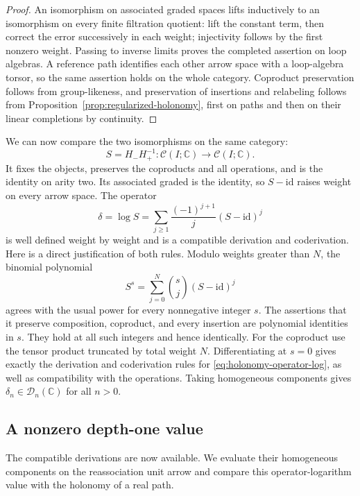 \documentclass[11pt]{article}
\theoremstyle{definition}
\theoremstyle{remark}
\numberwithin{equation}{section}
\begin{document}
\begin{proof}
An isomorphism on associated graded spaces lifts inductively to an
isomorphism on every finite filtration quotient: lift the constant
term, then correct the error successively in each weight; injectivity
follows by the first nonzero weight.  Passing to inverse limits proves
the completed assertion on loop algebras.  A reference path identifies
each other arrow space with a loop-algebra torsor, so the same assertion
holds on the whole category.  Coproduct preservation follows from
group-likeness, and preservation of insertions and relabeling follows
from Proposition~\ref{prop:regularized-holonomy}, first on paths and
then on their linear completions by continuity.
\end{proof}

We can now compare the two isomorphisms on the same category:
\[
 S=H_-H_+^{-1}:\mathcal C(I;\mathbb C)\longrightarrow\mathcal C(I;\mathbb C).
\]
It fixes the objects, preserves the coproducts and all operations,
and is the identity on arity two.  Its associated graded is the
identity, so $S-\mathrm{id}$ raises weight on every arrow space.  The operator
\begin{equation}\label{eq:holonomy-operator-log}
 \delta=\log S=
 \sum_{j\geq1}\frac{(-1)^{j+1}}j(S-\mathrm{id})^j
\end{equation}
is well defined weight by weight and is a compatible derivation and
coderivation.  Here is a direct justification of both rules.  Modulo
weights greater than $N$, the binomial polynomial
\[
 S^s=\sum_{j=0}^{N}\binom{s}{j}(S-\mathrm{id})^j
\]
agrees with the usual power for every nonnegative integer $s$.
The assertions that it preserve composition, coproduct, and every
insertion are polynomial identities in $s$.  They hold at all such
integers and hence identically.  For the coproduct use the tensor
product truncated by total weight $N$.  Differentiating at $s=0$
gives exactly the derivation and coderivation rules for
\eqref{eq:holonomy-operator-log}, as well as compatibility with the
operations.  Taking homogeneous components gives
$\delta_n\in\mathcal D_n(\mathbb C)$ for all $n>0$.

\subsection{A nonzero depth-one value}
The compatible derivations are now available.  We evaluate their
homogeneous components on the reassociation unit arrow and compare
this operator-logarithm value with the holonomy of a real path.
\end{document}
